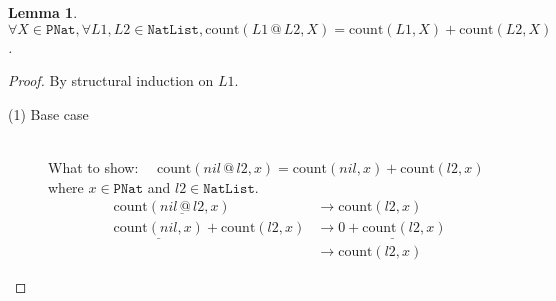 \documentclass[12pt, a4paper]{article}
\newtheorem{lemma}[theorem]{Lemma}
\newcommand{\rel}[1]{\mathrel{#1}}
\newcommand{\rmx}[1]{\mathrm{#1}}
\newcommand{\larrow}{\longrightarrow}
\newcommand{\under}{\underline}
\begin{document}
\begin{lemma}
\label{lm1}
$\forall X \in \mathtt{PNat}, \forall L1, L2 \in \mathtt{NatList}, \rmx{count}(L1 \rel{@} L2, X) = \rmx{count}(L1, X) + \rmx{count}(L2, X)$.
\end{lemma}
\begin{proof}
By structural induction on $L1$.
\begin{description}
\item[(1) Base case]~\\
\noindent
What to show: $\quad \rmx{count}(nil \rel{@} l2, x) = \rmx{count}(nil, x) + \rmx{count}(l2, x)$ \\
where $x \in \mathtt{PNat}$ and $l2 \in \mathtt{NatList}$.
\begin{align*}
\rmx{count}(\under{nil \rel{@} l2}, x) 
	&\larrow \rmx{count}(l2, x)  \tag{by @1} \\
\under{\rmx{count}(nil, x)} + \rmx{count}(l2, x)
	&\larrow \under{0 + \rmx{count}(l2, x)} \tag{by cnt1} \\
	&\larrow \rmx{count}(l2, x) \tag{by +1}
\end{align*}


\end{description}
\end{proof}
\end{document}
